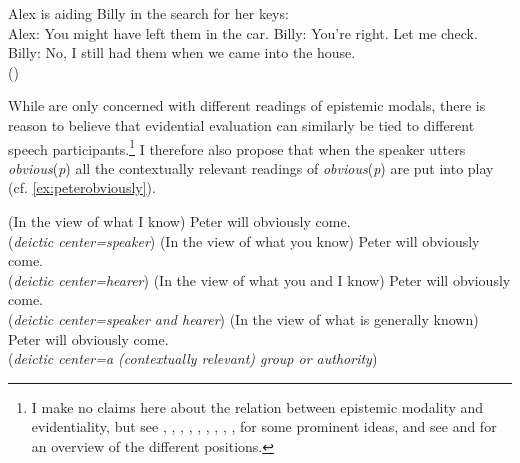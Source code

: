 \ea\label{ex:alex}  Alex is aiding Billy in the search for her keys:\\
Alex: You might have left them in the car. 
\ea\label{ex:billy1} Billy: You’re right. Let me check. 
	\ex\label{ex:billy2} Billy: No, I still had them when we came into the house. \\ (\citealt[114--115: ex 12--14]{Fintel2011})
\z
\z


While \citet{Fintel2011} are only concerned with different readings of epistemic modals, there is reason to believe that evidential evaluation can similarly be tied to different speech participants.\footnote{ I make no claims here about the relation between epistemic modality and evidentiality, but see  \citet{Auwera1998}, \citet{Haan1999}, \citet{Aikhenvald2004}, \citet{Palmer2001},  \citet{Rooryck2001}, \citet{Faller2006}, \citet{Diewald2010}, \citet{Fintel2010}, \citet{Boye2012},  \citet{Matthewson2015}  for some prominent ideas, and see \citet{Cornillie2009}  and \citet{Kocher2014} for an overview of the different positions.} I therefore also propose that  when the speaker utters \textit{obvious}(\textit{p}) all the contextually relevant readings of \textit{obvious}(\textit{p}) are put into play (cf. \ref{ex:peterobviously}).\largerpage

\ea\label{ex:peterobviously}
\ea(In the view of what I know) Peter will {obviously} come. \\
 (\textit{deictic center=speaker})
	\ex (In the view of what you know) Peter will {obviously} come. \\ (\textit{deictic center=hearer})
	\ex\label{ex:obviyouandI} (In the view of what you and I know) Peter will {obviously} come.  \\ (\textit{deictic center=speaker and hearer})
	\ex \label{ex:obvigeneral}(In the view of what is generally known) Peter will {obviously} come. \\(\textit{deictic center=a (contextually relevant) group or authority})
\z
\z



